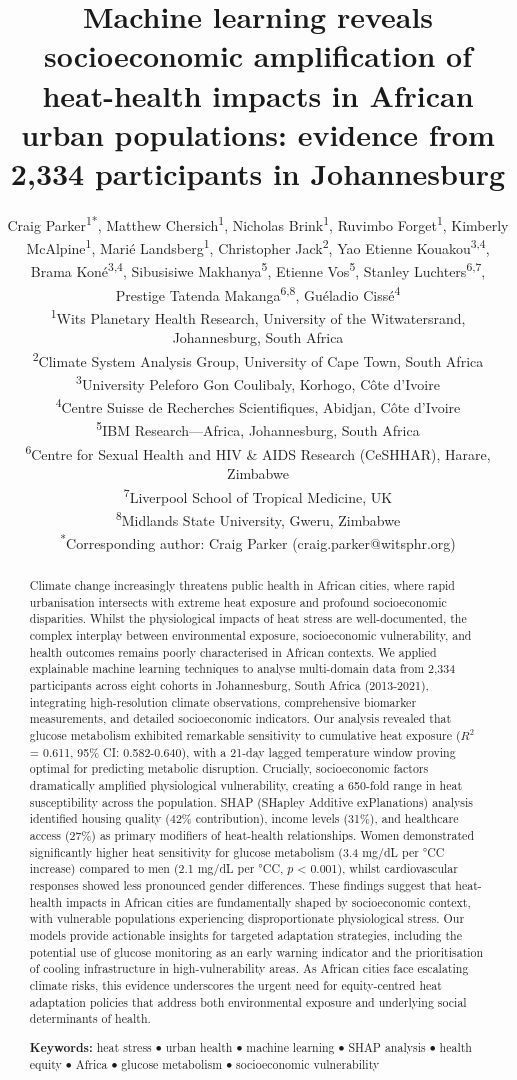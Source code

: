 \documentclass[11pt,a4paper]{article}
\title{Machine learning reveals socioeconomic amplification of heat-health impacts in African urban populations: evidence from 2,334 participants in Johannesburg}
\author{
Craig Parker\textsuperscript{1*}, 
Matthew Chersich\textsuperscript{1}, 
Nicholas Brink\textsuperscript{1}, 
Ruvimbo Forget\textsuperscript{1}, 
Kimberly McAlpine\textsuperscript{1}, 
Mari\'{e} Landsberg\textsuperscript{1}, 
Christopher Jack\textsuperscript{2}, 
Yao Etienne Kouakou\textsuperscript{3,4}, 
Brama Kon\'{e}\textsuperscript{3,4}, 
Sibusisiwe Makhanya\textsuperscript{5}, 
Etienne Vos\textsuperscript{5}, 
Stanley Luchters\textsuperscript{6,7}, 
Prestige Tatenda Makanga\textsuperscript{6,8}, 
Gu\'{e}ladio Ciss\'{e}\textsuperscript{4}\\
\vspace{0.3em}
\small
\textsuperscript{1}Wits Planetary Health Research, University of the Witwatersrand, Johannesburg, South Africa\\
\textsuperscript{2}Climate System Analysis Group, University of Cape Town, South Africa\\
\textsuperscript{3}University Peleforo Gon Coulibaly, Korhogo, C\^{o}te d'Ivoire\\
\textsuperscript{4}Centre Suisse de Recherches Scientifiques, Abidjan, C\^{o}te d'Ivoire\\
\textsuperscript{5}IBM Research---Africa, Johannesburg, South Africa\\
\textsuperscript{6}Centre for Sexual Health and HIV \& AIDS Research (CeSHHAR), Harare, Zimbabwe\\
\textsuperscript{7}Liverpool School of Tropical Medicine, UK\\
\textsuperscript{8}Midlands State University, Gweru, Zimbabwe\\
\vspace{0.3em}
\textsuperscript{*}Corresponding author: Craig Parker (craig.parker@witsphr.org)
}
\date{}
\newcommand{\degrees}{°C}
\begin{document}
\maketitle

\begin{abstract}
\noindent Climate change increasingly threatens public health in African cities, where rapid urbanisation intersects with extreme heat exposure and profound socioeconomic disparities. Whilst the physiological impacts of heat stress are well-documented, the complex interplay between environmental exposure, socioeconomic vulnerability, and health outcomes remains poorly characterised in African contexts. We applied explainable machine learning techniques to analyse multi-domain data from 2,334 participants across eight cohorts in Johannesburg, South Africa (2013-2021), integrating high-resolution climate observations, comprehensive biomarker measurements, and detailed socioeconomic indicators. Our analysis revealed that glucose metabolism exhibited remarkable sensitivity to cumulative heat exposure ($R^2$ = 0.611, 95\% CI: 0.582-0.640), with a 21-day lagged temperature window proving optimal for predicting metabolic disruption. Crucially, socioeconomic factors dramatically amplified physiological vulnerability, creating a 650-fold range in heat susceptibility across the population. SHAP (SHapley Additive exPlanations) analysis identified housing quality (42\% contribution), income levels (31\%), and healthcare access (27\%) as primary modifiers of heat-health relationships. Women demonstrated significantly higher heat sensitivity for glucose metabolism (3.4 mg/dL per \degrees C increase) compared to men (2.1 mg/dL per \degrees C, $p$ < 0.001), whilst cardiovascular responses showed less pronounced gender differences. These findings suggest that heat-health impacts in African cities are fundamentally shaped by socioeconomic context, with vulnerable populations experiencing disproportionate physiological stress. Our models provide actionable insights for targeted adaptation strategies, including the potential use of glucose monitoring as an early warning indicator and the prioritisation of cooling infrastructure in high-vulnerability areas. As African cities face escalating climate risks, this evidence underscores the urgent need for equity-centred heat adaptation policies that address both environmental exposure and underlying social determinants of health.

\vspace{0.5em}
\noindent \textbf{Keywords:} heat stress $\bullet$ urban health $\bullet$ machine learning $\bullet$ SHAP analysis $\bullet$ health equity $\bullet$ Africa $\bullet$ glucose metabolism $\bullet$ socioeconomic vulnerability
\end{abstract}
\end{document}
